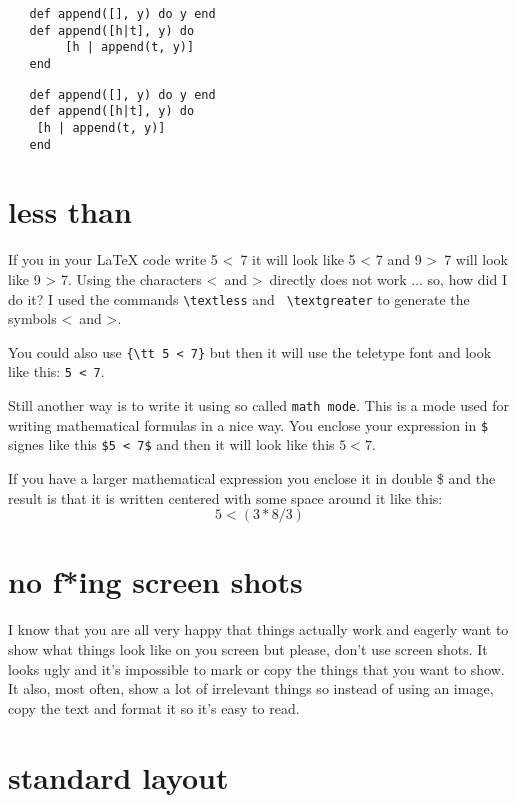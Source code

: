 \documentclass[a4paper,11pt]{article}
\begin{document}
\begin{verbatim}
   def append([], y) do y end
   def append([h|t], y) do
        [h | append(t, y)]
   end
\end{verbatim}

\begin{verbatim}
   def append([], y) do y end
   def append([h|t], y) do
	[h | append(t, y)]
   end
\end{verbatim}

\section*{less than}

If you in your LaTeX code write 5 \textless\ 7 it will look like 5 <
7 and 9 \textgreater\ 7 will look like 9 > 7. Using the characters
\textless\ and \textgreater\ directly does not work ... so, how did I
do it?  I used the commands {\tt  \textbackslash textless} and {\tt
  \textbackslash textgreater} to generate the symbols \textless\ and
\textgreater.

You could also use {\tt \{\textbackslash tt 5 < 7\}} but then it
will use the teletype font and look like this: {\tt 5 < 7}.

Still another way is to write it using so called {\tt math mode}. This
is a mode used for writing mathematical formulas in a nice way. You
enclose your expression in {\tt \$} signes like this {\tt \$5 < 7\$}
and then it will look like this $5 < 7$.

If you have a larger mathematical expression you enclose it in double
\$ and the result is that it is written centered with some space
around it like this:  $$ 5 < (3 * 8 / 3 ) $$


\section*{no f*ing screen shots}

I know that you are all very happy that things actually work and
eagerly want to show what things look like on you screen but please,
don't use screen shots. It looks ugly and it's impossible to mark or
copy the things that you want to show. It also, most often, show a lot
of irrelevant things so instead of using an image, copy the text and
format it so it's easy to read.


\section*{standard layout}
\end{document}
